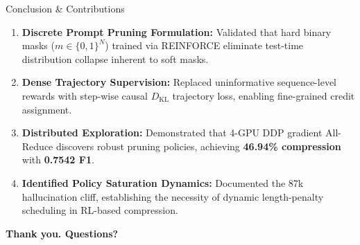 \documentclass[aspectratio=169,10pt]{beamer}
\begin{document}
\begin{frame}{Conclusion \& Contributions}
  \begin{enumerate}
    \item \textbf{Discrete Prompt Pruning Formulation:} Validated that hard binary masks ($m \in \{0, 1\}^N$) trained via REINFORCE eliminate test-time distribution collapse inherent to soft masks.
    \item \textbf{Dense Trajectory Supervision:} Replaced uninformative sequence-level rewards with step-wise causal $D_{\mathrm{KL}}$ trajectory loss, enabling fine-grained credit assignment.
    \item \textbf{Distributed Exploration:} Demonstrated that 4-GPU DDP gradient All-Reduce discovers robust pruning policies, achieving \textbf{46.94\% compression} with \textbf{0.7542 F1}.
    \item \textbf{Identified Policy Saturation Dynamics:} Documented the 87k hallucination cliff, establishing the necessity of dynamic length-penalty scheduling in RL-based compression.
  \end{enumerate}
  \vspace{0.3cm}
  \centering
  \textbf{Thank you. Questions?}
\end{frame}
\end{document}
